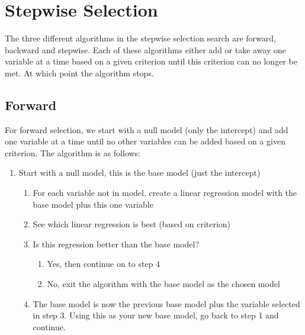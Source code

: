 \documentclass[
  letterpaper,
  DIV=11,
  numbers=noendperiod]{scrreprt}
\providecommand{\tightlist}{%
  \setlength{\itemsep}{0pt}\setlength{\parskip}{0pt}}\usepackage{longtable,booktabs,array}
\begin{document}
\hypertarget{stepwise-selection}{%
\section{Stepwise Selection}\label{stepwise-selection}}

The three different algorithms in the stepwise selection search are
forward, backward and stepwise. Each of these algorithms either add or
take away one variable at a time based on a given criterion until this
criterion can no longer be met. At which point the algorithm stops.

\hypertarget{forward}{%
\subsection*{Forward}\label{forward}}

For forward selection, we start with a null model (only the intercept)
and add one variable at a time until no other variables can be added
based on a given criterion. The algorithm is as follows:

\begin{enumerate}
\def\labelenumi{\arabic{enumi}.}
\setcounter{enumi}{-1}
\tightlist
\item
  Start with a null model, this is the base model (just the intercept)\\

  \begin{enumerate}
  \def\labelenumii{\arabic{enumii}.}
  \tightlist
  \item
    For each variable not in model, create a linear regression model
    with the base model plus this one variable\\
  \item
    See which linear regression is best (based on criterion)\\
  \item
    Is this regression better than the base model?\\

    \begin{enumerate}
    \def\labelenumiii{\alph{enumiii}.}
    \tightlist
    \item
      Yes, then continue on to step 4\\
    \item
      No, exit the algorithm with the base model as the chosen model\\
    \end{enumerate}
  \item
    The base model is now the previous base model plus the variable
    selected in step 3. Using this as your new base model, go back to
    step 1 and continue.\\
  \end{enumerate}
\end{enumerate}
\end{document}
